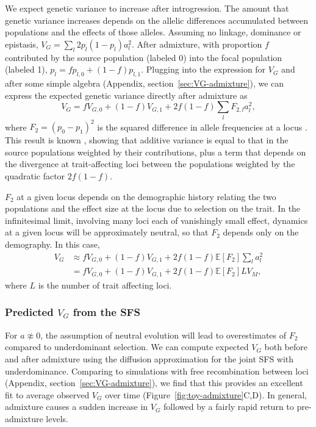 \documentclass{article}
\begin{document}
We expect genetic variance to increase after introgression. The amount that
genetic variance increases depends on the allelic differences accumulated
between populations and the effects of those alleles. Assuming no linkage,
dominance or epistasis, \(V_G=\sum_l 2p_l(1-p_l)a_l^2\). After admixture, with
proportion $f$ contributed by the source population (labeled 0) into the focal
population (labeled 1), \(p_l = fp_{l,0} + (1-f)p_{l,1}\). Plugging into the
expression for $V_G$ and after some simple algebra (Appendix,
section~\ref{sec:VG-admixture}), we can express the expected genetic variance
directly after admixture as \[V_G = fV_{G,0} + (1-f) V_{G,1} + 2f(1-f)\sum_l
F_{2,l} a_l^2,\] where $F_2 = (p_0 - p_1)^2$ is the squared difference in
allele frequencies at a locus \citep{peter2016admixture}. This result is known
\citep[e.g.,][]{tufto2000quantitative}, showing that additive variance is equal
to that in the source populations weighted by their contributions, plus a term
that depends on the divergence at trait-affecting loci between the populations
weighted by the quadratic factor $2f(1-f)$.

$F_2$ at a given locus depends on the demographic history
relating the two populations and the effect size at the locus due to selection
on the trait. In the infinitesimal limit, involving many loci each of
vanishingly small effect, dynamics at a given locus will be approximately
neutral, so that $F_2$ depends only on the demography. In this case,
\begin{align} \label{eq:VG-admixture}
    V_G & \approx f V_{G,0} + (1-f) V_{G,1} + 2f(1-f)\mathbb{E}[F_2] \sum_l a_l^2 \\
    \nonumber
    & = f V_{G,0} + (1-f) V_{G,1} + 2f(1-f)\mathbb{E}[F_2] L V_M,
\end{align}
where $L$ is the number of trait affecting loci.

\subsubsection*{Predicted $V_G$ from the SFS}

For $a \not\approx 0$, the assumption of neutral evolution will lead to
overestimates of $F_2$ compared to underdominant selection. We can compute
expected $V_G$ both before and after admixture using the diffusion
approximation for the joint SFS with underdominance. Comparing to simulations
with free recombination between loci (Appendix,
section~\ref{sec:VG-admixture}), we find that this provides an excellent fit to
average observed $V_G$ over time (Figure~\ref{fig:toy-admixture}C,D). In
general, admixture causes a sudden increase in $V_G$ followed by a fairly rapid
return to pre-admixture levels.
\end{document}
